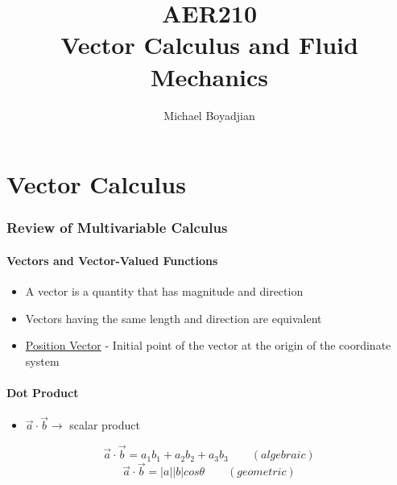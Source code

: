 \documentclass[11pt]{article}
\begin{document}
\title{AER210 \\ Vector Calculus and Fluid Mechanics}
\author{Michael Boyadjian}
\maketitle
\pagebreak

\tableofcontents

\pagebreak

\bigskip
\bigskip
\bigskip
\part{Vector Calculus}
\pagebreak

\section{Review of Multivariable Calculus}
\subsection{Vectors and Vector-Valued Functions}
\begin{itemize}
\item A vector is a quantity that has magnitude and direction
\item Vectors having the same length and direction are equivalent
\item \underline{Position Vector} - Initial point of the vector at the origin of the coordinate system
\end{itemize}

\subsection{Dot Product}
\begin{itemize}
\item $ \vec{a} \cdot \vec{b} \rightarrow$ scalar product
\end{itemize}
$$ \vec{a} \cdot \vec{b} = a_1b_1 + a_2b_2 + a_3b_3 \quad \quad (algebraic)$$
$$ \vec{a} \cdot \vec{b} = |a||b|cos\theta \quad \quad (geometric)$$
\end{document}
